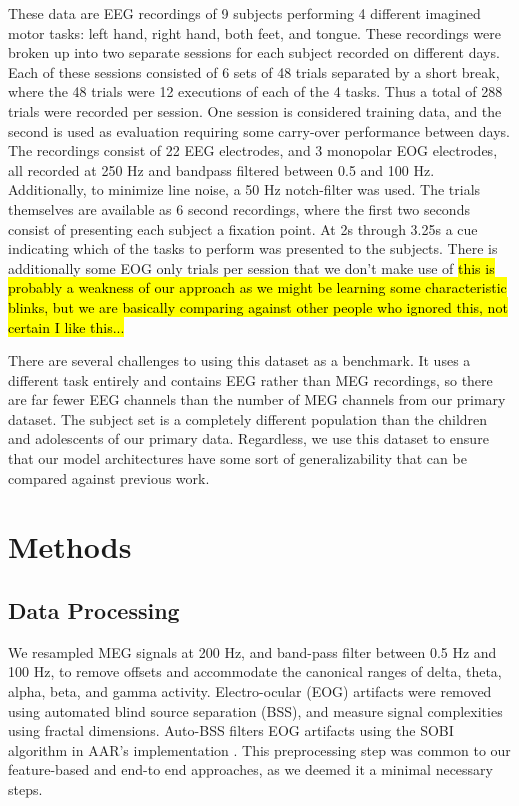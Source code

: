 \documentclass[utf8]{frontiersSCNS} %
\begin{document}
These data are EEG recordings of 9 subjects performing 4 different imagined motor tasks: left hand, right hand, both feet, and tongue. These recordings were broken up into two separate sessions for each subject recorded on different days. Each of these sessions consisted of 6 sets of 48 trials separated by a short break, where the 48 trials were 12 executions of each of the 4 tasks. Thus a total of 288 trials were recorded per session. One session is considered training data, and the second is used as evaluation requiring some carry-over performance between days. The recordings consist of 22 EEG electrodes, and 3 monopolar EOG electrodes, all recorded at 250 Hz and bandpass filtered between 0.5 and 100 Hz. Additionally, to minimize line noise, a 50 Hz notch-filter was used. The trials themselves are available as 6 second recordings, where the first two seconds consist of presenting each subject a fixation point. At 2s through 3.25s a cue indicating which of the tasks to perform was presented to the subjects. There is additionally some EOG only trials per session that we don't make use of \hl{this is probably a weakness of our approach as we might be learning some characteristic blinks, but we are basically comparing against other people who ignored this, not certain I like this...}

There are several challenges to using this dataset as a benchmark. It uses a different task entirely and contains EEG rather than MEG recordings, so there are far fewer EEG channels than the number of MEG channels from our primary dataset. The subject set is a completely different population than the children and adolescents of our primary data. Regardless, we use this dataset to ensure that our model architectures have some sort of generalizability that can be compared against previous work. 

\section{Methods}


\subsection{Data Processing}

We resampled MEG signals at 200 Hz, and band-pass filter between 0.5 Hz and 100 Hz, to remove offsets and accommodate the canonical ranges of delta, theta, alpha, beta, and gamma activity. Electro-ocular (EOG) artifacts were removed using automated blind source separation (BSS), and measure signal complexities using fractal dimensions. Auto-BSS filters EOG artifacts using the SOBI algorithm in AAR's implementation \cite{eog}. This preprocessing step was common to our feature-based and end-to end approaches, as we deemed it a minimal necessary steps.
\end{document}
